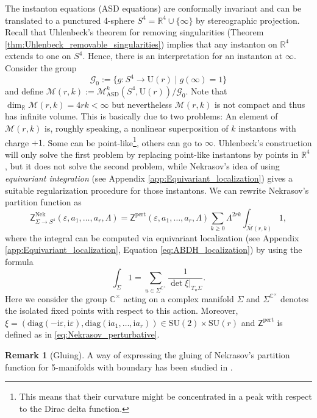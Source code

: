 \documentclass[11pt,colorinlistoftodos]{amsart}
\numberwithin{equation}{subsection}
\theoremstyle{plain}
\theoremstyle{definition}
\newtheorem{rem}[thm]{Remark}
\theoremstyle{remark}
\newcommand{\R}{\mathbb{R}}
\newcommand{\C}{\mathbb{C}}
\newcommand{\calM}{\mathcal{M}}
\newcommand{\I}{\mathrm{i}}
\begin{document}
The instanton equations (ASD equations) are conformally invariant and can be translated to a punctured 4-sphere $S^4=\R^4\cup\{\infty\}$ by stereographic projection. Recall that Uhlenbeck's theorem for removing singularities (Theorem \ref{thm:Uhlenbeck_removable_singularities}) implies that any instanton on $\R^4$ extends to one on $S^4$. Hence, there is an interpretation for an instanton at $\infty$. Consider the group
\[
\mathcal{G}_0:=\{g\colon S^4\to \mathrm{U}(r)\mid g(\infty)=1\}
\]
and define $\calM(r,k):=\calM^k_\mathrm{ASD}(S^4,\mathrm{U}(r))/\mathcal{G}_0$. Note that $\dim_\R\calM(r,k)=4rk<\infty$ but nevertheless $\calM(r,k)$ is not compact and thus has infinite volume. This is basically due to two problems: An element of $\calM(r,k)$ is, roughly speaking, a nonlinear superposition of $k$ instantons with charge $+1$. Some can be point-like\footnote{This means that their curvature might be concentrated in a peak with respect to the Dirac delta function.}, others can go to $\infty$. Uhlenbeck's construction will only solve the first problem by replacing point-like instantons by points in $\R^4$, but it does not solve the second problem, while Nekrasov's idea of using \emph{equivariant integration} (see Appendix \ref{app:Equivariant_localization}) gives a suitable regularization procedure for those instantons.
We can rewrite Nekrasov's partition function as 
\begin{equation}
\label{eq:Nekrasov_partition_function_explicit}
\mathsf{Z}^\mathrm{Nek}_{\Sigma\to S^4}(\varepsilon,a_1,\ldots,a_r,\Lambda)=\mathsf{Z}^\mathrm{pert}(\varepsilon,a_1,\ldots,a_r,\Lambda)\sum_{k\geq 0}\Lambda^{2rk}\int_{\overline{\calM}(r,k)}1,
\end{equation}
where the integral can be computed via equivariant localization (see Appendix \ref{app:Equivariant_localization}, Equation \eqref{eq:ABDH_localization}) by using the formula
\[
\int_\Sigma1=\sum_{u\in \Sigma^{\C^\times}}\frac{1}{\det \xi|_{T_u\Sigma}}.
\]
Here we consider the group $\C^\times$ acting on a complex manifold $\Sigma$ and $\Sigma^{\C^\times}$ denotes the isolated fixed points with respect to this action. Moreover, $\xi=(\mathrm{diag}(-\I\varepsilon,\I\varepsilon),\mathrm{diag}(\I a_1,\ldots, \I a_r))\in \mathrm{SU}(2)\times \mathrm{SU}(r)$ and $\mathsf{Z}^{\mathrm{pert}}$ is defined as in \eqref{eq:Nekrasov_perturbative}.


\begin{rem}[Gluing]
A way of expressing the gluing of Nekrasov's partition function for 5-manifolds with boundary has been studied in \cite{QiuTizzianoWindingZabzine2015}. 
\end{rem}
\end{document}
